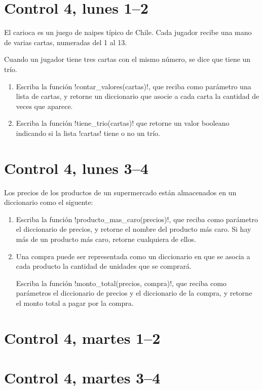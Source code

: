 \documentclass[12pt,spanish,a5paper,landscape]{article}
\begin{document}
  \pagestyle{empty}
  \thispagestyle{empty}

  \part*{Control 4, lunes 1--2}
  \newpage

  El carioca es un juego de naipes típico de Chile.
  Cada jugador recibe una mano de varias cartas,
  numeradas del 1 al 13.

  Cuando un jugador tiene tres cartas con el mismo número,
  se dice que tiene un trío.

  \begin{enumerate}
    \item
      Escriba la función \li!contar_valores(cartas)!,
      que reciba como parámetro una lista de cartas,
      y retorne un diccionario que asocie a cada carta
      la cantidad de veces que aparece.
      

    \item
      Escriba la función \li!tiene_trio(cartas)!
      que retorne un valor booleano
      indicando si la lista \li!cartas! tiene o no un trío.
      

  \end{enumerate}
  \newpage

  \part*{Control 4, lunes 3--4}
  \newpage

  Los precios de los productos de un supermercado
  están almacenados en un diccionario como el siguente:
  

  \begin{enumerate}
    \item
      Escriba la función \li!producto_mas_caro(precios)!,
      que reciba como parámetro el diccionario de precios,
      y retorne el nombre del producto más caro.
      Si hay más de un producto más caro,
      retorne cualquiera de ellos.
      

    \item
      Una compra puede ser representada como un diccionario
      en que se asocia a cada producto
      la cantidad de unidades que se comprará.

      Escriba la función \li!monto_total(precios, compra)!,
      que reciba como parámetros el diccionario de precios
      y el diccionario de la compra,
      y retorne el monto total a pagar por la compra.
      

  \end{enumerate}
  \newpage

  \part*{Control 4, martes 1--2}
  \newpage

  \newpage

  \part*{Control 4, martes 3--4}
  \newpage
\end{document}
